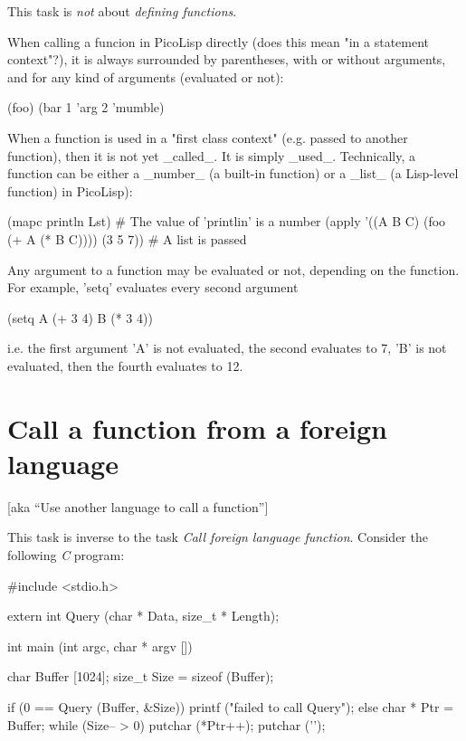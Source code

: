 This task is \emph{not} about \emph{defining functions}.

\begin{wideverbatim}

When calling a funcion in PicoLisp directly (does this mean "in a statement
context"?), it is always surrounded by parentheses, with or without arguments,
and for any kind of arguments (evaluated or not):

(foo)
(bar 1 'arg 2 'mumble)

When a function is used in a "first class context" (e.g. passed to another
function), then it is not yet _called_. It is simply _used_. Technically, a
function can be either a _number_ (a built-in function) or a _list_ (a
Lisp-level function) in PicoLisp):

(mapc println Lst)  # The value of 'printlin' is a number
(apply '((A B C) (foo (+ A (* B C)))) (3 5 7))  # A list is passed

Any argument to a function may be evaluated or not, depending on the function.
For example, 'setq' evaluates every second argument

(setq A (+ 3 4)  B (* 3 4))

i.e. the first argument 'A' is not evaluated, the second evaluates to 7, 'B' is
not evaluated, then the fourth evaluates to 12.

\end{wideverbatim}

\pagebreak{}
\section*{Call a function from a foreign language}
[aka ``Use another language to call a function'']

This task is inverse to the task \emph{Call foreign language
  function}. Consider the following \emph{C} program:

\begin{wideverbatim}

#include <stdio.h>
 
extern int Query (char * Data, size_t * Length);
 
int main (int argc, char * argv [])
{
   char     Buffer [1024];
   size_t   Size = sizeof (Buffer);
 
   if (0 == Query (Buffer, &Size))
   {
      printf ("failed to call Query\n");
   }
   else
   {
      char * Ptr = Buffer;
      while (Size-- > 0) putchar (*Ptr++);
      putchar ('\n');
   }
}

\end{wideverbatim}

